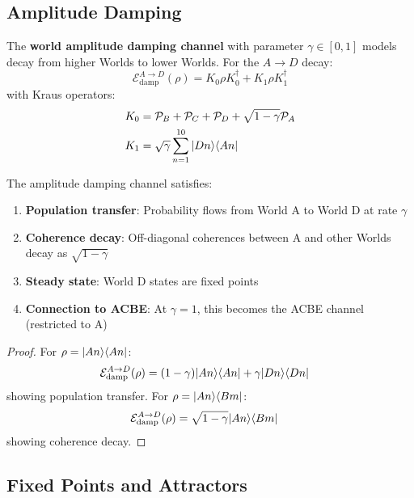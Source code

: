 \subsection{Amplitude Damping}

\begin{definition}
\label{def:amplitude-damping}
The \textbf{world amplitude damping channel} with parameter $\gamma \in [0,1]$ models decay from higher Worlds to lower Worlds. For the $A \to D$ decay:
\[
\mathcal{E}_{\mathrm{damp}}^{A \to D}(\rho) = K_0 \rho K_0^\dagger + K_1 \rho K_1^\dagger
\]
with Kraus operators:
\begin{align}
K_0 &= \mathcal{P}_B + \mathcal{P}_C + \mathcal{P}_D + \sqrt{1-\gamma} \mathcal{P}_A \\
K_1 &= \sqrt{\gamma} \sum_{n=1}^{10} |Dn\rangle\langle An|
\end{align}
\end{definition}

\begin{proposition}
\label{prop:amp-damp-properties}
The amplitude damping channel satisfies:
\begin{enumerate}
  \item \textbf{Population transfer}: Probability flows from World A to World D at rate $\gamma$
  \item \textbf{Coherence decay}: Off-diagonal coherences between A and other Worlds decay as $\sqrt{1-\gamma}$
  \item \textbf{Steady state}: World D states are fixed points
  \item \textbf{Connection to ACBE}: At $\gamma = 1$, this becomes the ACBE channel (restricted to A)
\end{enumerate}
\end{proposition}

\begin{proof}
For $\rho = |An\rangle\langle An|$:
\begin{align}
\mathcal{E}_{\mathrm{damp}}^{A \to D}(\rho) &= (1-\gamma)|An\rangle\langle An| + \gamma |Dn\rangle\langle Dn|
\end{align}
showing population transfer. For $\rho = |An\rangle\langle Bm|$:
\begin{align}
\mathcal{E}_{\mathrm{damp}}^{A \to D}(\rho) &= \sqrt{1-\gamma} |An\rangle\langle Bm|
\end{align}
showing coherence decay.
\end{proof}

\subsection{Fixed Points and Attractors}

